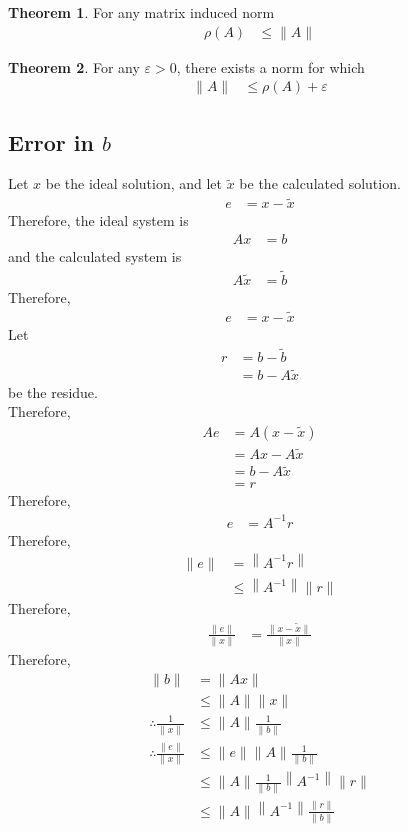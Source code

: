 \documentclass[fleqn, a4paper, 12pt, twoside, titlepage]{article}
\theoremstyle{definition}
\theoremstyle{theorem}
\newtheorem{theorem}{Theorem}
\renewcommand{\tilde}{\widetilde}
\begin{document}
\begin{theorem}
	For any matrix induced norm
	\begin{align*}
		\rho(A) &\le \|A\|
	\end{align*}
\end{theorem}

\begin{theorem}
	For any $\varepsilon > 0$, there exists a norm for which
	\begin{align*}
		\|A\| &\le \rho(A) + \varepsilon
	\end{align*}
\end{theorem}

\subsection{Error in $b$}

Let $x$ be the ideal solution, and let $\tilde{x}$ be the calculated solution.
\begin{align*}
	e &= x - \tilde{x}
\end{align*}
Therefore, the ideal system is
\begin{align*}
	A x &= b
\end{align*}
and the calculated system is
\begin{align*}
	A \tilde{x} &= \tilde{b}
\end{align*}
Therefore,
\begin{align*}
	e &= x - \tilde{x}
\end{align*}
Let
\begin{align*}
	r &= b - \tilde{b}\\
	&= b - A \tilde{x}
\end{align*}
be the residue.\\
Therefore,
\begin{align*}
	A e &= A (x - \tilde{x})\\
	&= A x - A \tilde{x}\\
	&= b - A \tilde{x}\\
	&= r
\end{align*}
Therefore,
\begin{align*}
	e &= A^{-1} r
\end{align*}
Therefore,
\begin{align*}
	\|e\| &= \left\| A^{-1} r \right\|\\
	&\le \left\| A^{-1} \right\| \|r\|
\end{align*}
Therefore,
\begin{align*}
	\frac{\|e\|}{\|x\|} &= \frac{\|x - \tilde{x}\|}{\|x\|}
\end{align*}
Therefore,
\begin{align*}
	\|b\| &= \|A x\|\\
	&\le \|A\| \|x\|\\
	\therefore \frac{1}{\|x\|} &\le \|A\| \frac{1}{\|b\|}\\
	\therefore \frac{\|e\|}{\|x\|} &\le \|e\| \|A\| \frac{1}{\|b\|}\\
	&\le \|A\| \frac{1}{\|b\|} \left\| A^{-1} \right\| \|r\|\\
	&\le \|A\| \left\| A^{-1} \right\| \frac{\|r\|}{\|b\|}
\end{align*}
\end{document}
